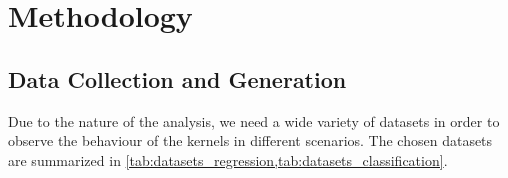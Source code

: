 





\section{Methodology}

\subsection{Data Collection and Generation}%

Due to the nature of the analysis, we need a wide variety of datasets in order
to observe the behaviour of the kernels in different scenarios. The chosen
datasets are summarized in \cref{tab:datasets_regression,tab:datasets_classification}.

